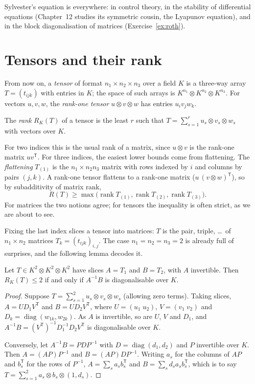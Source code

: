 Sylvester's equation is everywhere: in control theory, in the stability of differential equations (Chapter~12
studies its symmetric cousin, the Lyapunov equation), and in the block diagonalisation of matrices (Exercise~\ref{ex:roth}).

\section{Tensors and their rank}

From now on, a \emph{tensor} of format $n_1\times n_2\times n_3$ over a field $K$ is a three-way array $T=(t_{ijk})$ with entries in
$K$; the space of such arrays is $K^{n_1}\otimes K^{n_2}\otimes K^{n_3}$. For vectors $u,v,w$, the \emph{rank-one tensor}
$u\otimes v\otimes w$ has entries $u_iv_jw_k$.

\begin{definition}\label{def:tensorrank}
The \emph{rank} $R_K(T)$ of a tensor is the least $r$ such that $T=\sum_{s=1}^ru_s\otimes v_s\otimes w_s$ with vectors over $K$.
\end{definition}

For two indices this is the usual rank of a matrix, since $u\otimes v$ is the rank-one matrix $uv^{\mathsf T}$. For three indices, the
easiest lower bounds come from flattening. The \emph{flattening} $T_{(1)}$ is the $n_1\times n_2n_3$ matrix with rows indexed by $i$
and columns by pairs $(j,k)$. A rank-one tensor flattens to a rank-one matrix ($u\,(v\otimes w)^{\mathsf T}$), so by subadditivity of
matrix rank,
\[
R(T)\ge\max\bigl(\operatorname{rank}T_{(1)},\operatorname{rank}T_{(2)},\operatorname{rank}T_{(3)}\bigr).
\]
For matrices the two notions agree; for tensors the inequality is often strict, as we are about to see.

Fixing the last index slices a tensor into matrices: $T$ is the pair, triple, \dots\ of $n_1\times n_2$ matrices $T_k=(t_{ijk})_{i,j}$.
The case $n_1=n_2=n_3=2$ is already full of surprises, and the following lemma decodes it.

\begin{lemma}\label{lem:slices}
Let $T\in K^2\otimes K^2\otimes K^2$ have slices $A=T_1$ and $B=T_2$, with $A$ invertible. Then $R_K(T)\le2$ if and only if $A^{-1}B$
is diagonalisable over $K$.
\end{lemma}
\begin{proof}
Suppose $T=\sum_{s=1}^2u_s\otimes v_s\otimes w_s$ (allowing zero terms). Taking slices, $A=UD_1V^{\mathsf T}$ and $B=UD_2V^{\mathsf T}$, where
$U=(u_1\;u_2)$, $V=(v_1\;v_2)$ and $D_k=\operatorname{diag}(w_{1k},w_{2k})$. As $A$ is invertible, so are $U$, $V$ and $D_1$, and
$A^{-1}B=(V^{\mathsf T})^{-1}D_1^{-1}D_2V^{\mathsf T}$ is diagonalisable over $K$.

Conversely, let $A^{-1}B=PDP^{-1}$ with $D=\operatorname{diag}(d_1,d_2)$ and $P$ invertible over $K$. Then $A=(AP)P^{-1}$ and $B=(AP)D
P^{-1}$. Writing $a_s$ for the columns of $AP$ and $b_s^{\mathsf T}$ for the rows of $P^{-1}$, $A=\sum_sa_sb_s^{\mathsf T}$ and $B=\sum_sd_sa_s
b_s^{\mathsf T}$, which is to say $T=\sum_{s=1}^2a_s\otimes b_s\otimes(1,d_s)$.
\end{proof}

